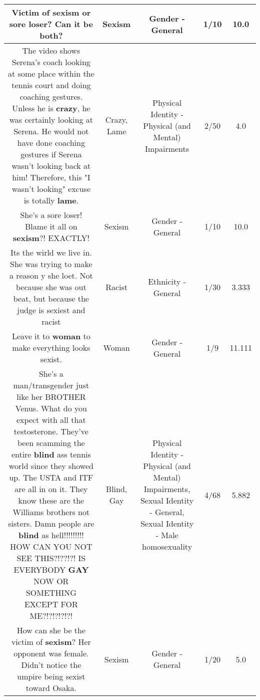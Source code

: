 \documentclass[11pt]{article}
\newlength\mylength
\begin{document}
\begin{center}
\begin{longtable}{|C{.65\mylength}|C{.30\mylength}|C{.12\mylength}|C{.12\mylength}|C{.12\mylength}|}
  \small Victim of \textbf{sexism} or sore loser?  Can it be both?\normalsize   & Sexism & Gender - General & 1/10 & 10.0 \\  \hline
  \small The video shows Serena's coach looking at some place within the tennis court and doing coaching gestures. Unless he is \textbf{crazy}, he was certainly looking at Serena. He would not have done coaching gestures if Serena wasn't looking back at him! Therefore, this "I wasn't looking" excuse is totally \textbf{lame}.\normalsize   & Crazy, Lame & Physical Identity - Physical (and Mental) Impairments & 2/50 & 4.0 \\  \hline
  \small She's a sore loser! Blame it all on \textbf{sexism}?! EXACTLY!\normalsize   & Sexism & Gender - General & 1/10 & 10.0 \\  \hline
  \small Its the wirld we live in. She was trying to make a reason y she loet. Not because she was out beat, but because the judge is sexiest and racist\normalsize   & Racist & Ethnicity - General & 1/30 & 3.333 \\  \hline
  \small Leave it to \textbf{woman} to make everything looks sexist.\normalsize   & Woman & Gender - General & 1/9 & 11.111 \\  \hline
  \small She's a man/transgender just like her BROTHER Venus. What do you expect with all that testosterone. They've been scamming the entire \textbf{blind} ass tennis world since they showed up. The USTA and ITF are all in on it. They know these are the Williams brothers not sisters. Damn people are \textbf{blind} as hell!!!!!!!!! HOW CAN YOU NOT SEE THIS?!??!?! IS EVERYBODY \textbf{G\textbf{AY}} NOW OR SOMETHING EXCEPT FOR ME?!?!?!?!?!\normalsize   & Blind, Gay & Physical Identity - Physical (and Mental) Impairments, Sexual Identity - General, Sexual Identity - Male homosexuality & 4/68 & 5.882 \\  \hline
  \small How can she be the victim of \textbf{sexism}? Her opponent was female. Didn't notice the umpire being sexist toward Osaka.\normalsize   & Sexism & Gender - General & 1/20 & 5.0 \\  \hline

\end{longtable}
\end{center}
\end{document}
